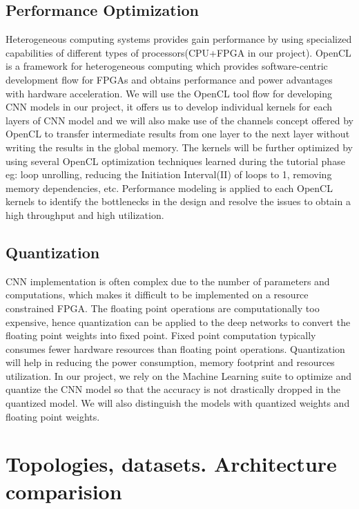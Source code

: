 \documentclass[titlepage]{report}
\begin{document}
\section{Performance Optimization}
Heterogeneous computing systems provides gain performance by using specialized capabilities of different types of processors(CPU+FPGA in our project). OpenCL is a framework for heterogeneous computing which provides software-centric development flow for FPGAs and obtains performance and power advantages with hardware acceleration. We will use the OpenCL tool flow for developing CNN models in our project, it offers us to develop individual kernels for each layers of CNN model and we will also make use of the channels concept offered by OpenCL to transfer intermediate results from one layer to the next layer without writing the results in the global memory. The kernels will be further optimized by using several OpenCL optimization techniques learned during the tutorial phase eg: loop unrolling, reducing the Initiation Interval(II) of loops to 1, removing memory dependencies, etc. Performance modeling is applied to each OpenCL kernels to identify the bottlenecks in the design and resolve the issues to obtain a high throughput and high utilization.

\section{Quantization }
CNN implementation is often complex due to the number of parameters and computations, which makes it difficult to be implemented on a resource constrained FPGA. The floating point operations are computationally too expensive, hence quantization can be applied to the deep networks to convert the floating point weights into fixed point. Fixed point computation typically consumes fewer hardware resources than floating point operations. Quantization will help in reducing the power consumption, memory footprint and resources utilization. In our project, we rely on the Machine Learning suite to optimize and quantize the CNN model so that the accuracy is not drastically dropped in the quantized model. We will also distinguish the models with quantized weights and floating point weights.


\chapter{Topologies, datasets. Architecture comparision}
\end{document}
